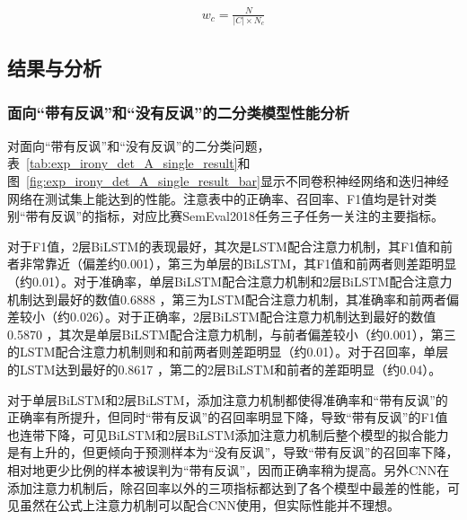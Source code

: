 \begin{align}
    \label{eq:class_weight}
    w_c = \frac{N}{|C| \times N_c}
\end{align}

\subsection{结果与分析}

\subsubsection{面向“带有反讽”和“没有反讽”的二分类模型性能分析}

对面向“带有反讽”和“没有反讽”的二分类问题，表~\ref{tab:exp_irony_det_A_single_result}和图~\ref{fig:exp_irony_det_A_single_result_bar}显示不同卷积神经网络和迭归神经网络在测试集上能达到的性能。注意表中的正确率、召回率、F1值均是针对类别“带有反讽”的指标，对应比赛SemEval2018任务三子任务一关注的主要指标。

对于F1值，2层BiLSTM的表现最好，其次是LSTM配合注意力机制，其F1值和前者非常靠近（偏差约0.001），第三为单层的BiLSTM，其F1值和前两者则差距明显（约0.01）。对于准确率，单层BiLSTM配合注意力机制和2层BiLSTM配合注意力机制达到最好的数值0.6888 ，第三为LSTM配合注意力机制，其准确率和前两者偏差较小（约0.026）。对于正确率，2层BiLSTM配合注意力机制达到最好的数值0.5870 ，其次是单层BiLSTM配合注意力机制，与前者偏差较小（约0.001），第三的LSTM配合注意力机制则和和前两者则差距明显（约0.01）。对于召回率，单层的LSTM达到最好的0.8617 ，第二的2层BiLSTM和前者的差距明显（约0.04）。

对于单层BiLSTM和2层BiLSTM，添加注意力机制都使得准确率和“带有反讽”的正确率有所提升，但同时“带有反讽”的召回率明显下降，导致“带有反讽”的F1值也连带下降，可见BiLSTM和2层BiLSTM添加注意力机制后整个模型的拟合能力是有上升的，但更倾向于预测样本为“没有反讽”，导致“带有反讽”的召回率下降，相对地更少比例的样本被误判为“带有反讽”，因而正确率稍为提高。另外CNN在添加注意力机制后，除召回率以外的三项指标都达到了各个模型中最差的性能，可见虽然在公式上注意力机制可以配合CNN使用，但实际性能并不理想。

